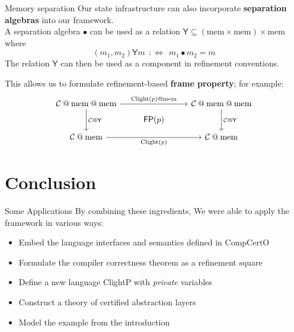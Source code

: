 \documentclass[aspectratio=1610,mathserif]{beamer}
\newcommand{\kw}[1]{\ensuremath{ \mathrm{#1} }}
\begin{document}
\begin{frame}[fragile]{Memory separation}
  Our state infrastructure can also incorporate
  \textbf{separation algebras} into our framework. \\
  A separation algebra $\bullet$ can be used as a relation
  $\mathsf{Y} \subseteq (\kw{mem} \times \kw{mem}) \times \kw{mem}$
  where
  \[
    (m_1, m_2) \mathrel{\mathsf{Y}} m \:\: :\Leftrightarrow \:\:
    m_1 \bullet m_2 = m
  \]
  The relation $\mathsf{Y}$ can then be used as a component in refinement conventions.

  \pause \vfill
  This allows us to formulate refinement-based \textbf{frame property};
  for example:
  \[
    \begin{tikzcd}[row sep=tiny]
      \mathcal{C} \mathbin@ \kw{mem} \mathbin@ \kw{mem}
        \ar[rr, "\kw{Clight}(p) \mathbin@ \kw{mem}"]
        \ar[dd, "\mathcal{C} \mathbin@ \mathsf{Y}"] &&
      \mathcal{C} \mathbin@ \kw{mem} \mathbin@ \kw{mem}
        \ar[dd, "\mathcal{C} \mathbin@ \mathsf{Y}"]
      \\
      & \mathsf{FP}(p) &
      \\
      \mathcal{C} \mathbin@ \kw{mem}
        \ar[rr, "\kw{Clight}(p)"'] &&
      \mathcal{C} \mathbin@ \kw{mem}
    \end{tikzcd}
  \]
\end{frame}

\section{Conclusion}

\begin{frame}{Some Applications}
By combining these ingredients,
We were able to apply the framework in various ways:
\begin{itemize}
  \item Embed the language interfaces and semantics defined in CompCertO
  \item Formulate the compiler correctness theorem as a refinement square
  \item Define a new language ClightP with \emph{private} variables
  \item Construct a theory of certified abstraction layers
  \item Model the example from the introduction
\end{itemize}
\end{frame}
\end{document}
